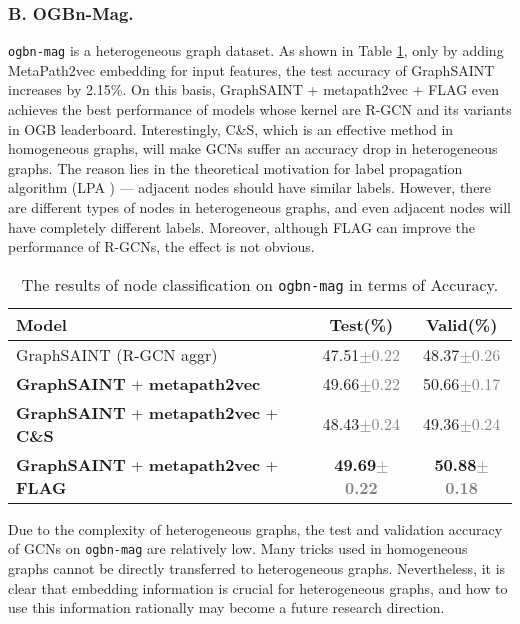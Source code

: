 \documentclass[runningheads]{llncs}
\newcommand{\std}[1]{\textcolor{gray}{\scriptsize{$\pm$#1}}}
\begin{document}
\subsubsection{B. OGBn-Mag.}
\texttt{ogbn-mag} is a heterogeneous graph dataset. As shown
in Table \ref{table:ogbn-mag}, only by adding MetaPath2vec embedding for input features, the test accuracy of GraphSAINT increases 
by 2.15\%. On this basis, GraphSAINT + metapath2vec + FLAG even achieves the best performance of models whose kernel are R-GCN and its variants in OGB leaderboard. Interestingly, C\&S, which is an effective
method in homogeneous graphs, will make GCNs suffer an accuracy drop in heterogeneous graphs. The reason lies in the theoretical motivation for label propagation algorithm (LPA \cite{zhu2005semi})
--- adjacent nodes should have similar labels. However, there are
different types of nodes in heterogeneous graphs, and even
adjacent nodes will have completely different labels. Moreover, although FLAG can
improve the performance of R-GCNs, the effect is not obvious.

\begin{table}[htbp] 
\caption{The results of node classification on \texttt{ogbn-mag} in terms of Accuracy. }
\label{table:ogbn-mag}
\begin{center}
\renewcommand\tabcolsep{7.0pt}
\begin{tabular}{l|c|c}
\hline
\textbf{Model}  & \textbf{Test(\%)} & \textbf{Valid(\%)}  \\
\hline
\hline
GraphSAINT (R-GCN aggr) \cite{zeng2019graphsaint} & 47.51\std{0.22} & 48.37\std{0.26} \\
\hline
\hline
\textbf{GraphSAINT} + \textbf{metapath2vec} & 49.66\std{0.22} & 50.66\std{0.17} \\
\textbf{GraphSAINT} + \textbf{metapath2vec} + \textbf{C\&S} & 48.43\std{0.24} & 49.36\std{0.24} \\
\textbf{GraphSAINT} + \textbf{metapath2vec} + \textbf{FLAG} & \textbf{49.69\std{0.22}} &
\textbf{50.88\std{0.18}} \\
\hline
\end{tabular}
\end{center} 
\end{table}

Due to the complexity of heterogeneous graphs, the test and validation accuracy of GCNs on \texttt{ogbn-mag} are
relatively low. Many tricks used in homogeneous graphs cannot be
directly transferred to heterogeneous graphs. Nevertheless, it is clear that
embedding information is crucial for heterogeneous graphs, and how
to use this information rationally may become a future research direction.
\end{document}
